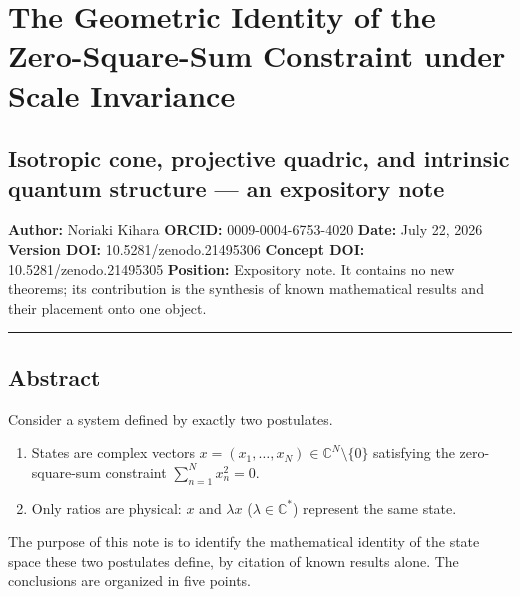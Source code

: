 \documentclass[
  a4paper,
]{article}
\author{}
\date{}
\providecommand{\tightlist}{%
  \setlength{\itemsep}{0pt}\setlength{\parskip}{0pt}}
\begin{document}
\section{The Geometric Identity of the Zero-Square-Sum Constraint under
Scale
Invariance}\label{the-geometric-identity-of-the-zero-square-sum-constraint-under-scale-invariance}

\subsection{Isotropic cone, projective quadric, and intrinsic quantum
structure --- an expository
note}\label{isotropic-cone-projective-quadric-and-intrinsic-quantum-structure-an-expository-note}

\textbf{Author:} Noriaki Kihara \textbf{ORCID:} 0009-0004-6753-4020
\textbf{Date:} July 22, 2026 \textbf{Version DOI:}
10.5281/zenodo.21495306 \textbf{Concept DOI:} 10.5281/zenodo.21495305
\textbf{Position:} Expository note. It contains no new theorems; its
contribution is the synthesis of known mathematical results and their
placement onto one object.

\begin{center}\rule{0.5\linewidth}{0.5pt}\end{center}

\subsection{Abstract}\label{abstract}

Consider a system defined by exactly two postulates.

\begin{enumerate}
\def\labelenumi{\arabic{enumi}.}
\tightlist
\item
  States are complex vectors
  \(x=(x_1,\dots,x_N)\in\mathbb C^N\setminus\{0\}\) satisfying the
  zero-square-sum constraint \(\sum_{n=1}^N x_n^2=0\).
\item
  Only ratios are physical: \(x\) and \(\lambda x\)
  (\(\lambda\in\mathbb C^\ast\)) represent the same state.
\end{enumerate}

The purpose of this note is to identify the mathematical identity of the
state space these two postulates define, by citation of known results
alone. The conclusions are organized in five points.
\end{document}
